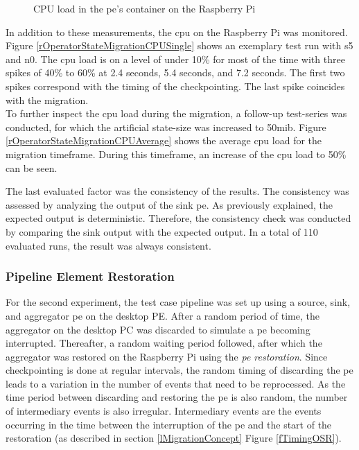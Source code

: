 \begin{figure}[!ht]
    \centering
    \caption{CPU load in the \gls{pe}'s container on the Raspberry Pi}%
    \label{rOperatorStateMigrationCPU}%
\end{figure}


In addition to these measurements, the \gls{cpu} on the Raspberry Pi was monitored. Figure \ref{rOperatorStateMigrationCPUSingle} shows an exemplary test run with s5 and n0. The \gls{cpu} load is on a level of under 10\% for most of the time with three spikes of 40\% to 60\% at 2.4 seconds, 5.4 seconds, and 7.2 seconds. The first two spikes correspond with the timing of the checkpointing. The last spike coincides with the migration.\\
To further inspect the \gls{cpu} load during the migration, a follow-up test-series was conducted, for which the artificial state-size was increased to 50\gls{mib}. Figure \ref{rOperatorStateMigrationCPUAverage} shows the average \gls{cpu} load for the migration timeframe. During this timeframe, an increase of the \gls{cpu} load to 50\% can be seen.\par

The last evaluated factor was the consistency of the results. The consistency was assessed by analyzing the output of the sink \gls{pe}. As previously explained, the expected output is deterministic. Therefore, the consistency check was conducted by comparing the sink output with the expected output. In a total of 110 evaluated runs, the result was always consistent. 

\subsubsection{Pipeline Element Restoration}
\label{lResultsOperatorStateRestoration}
For the second experiment, the test case pipeline was set up using a source, sink, and aggregator \gls{pe} on the desktop PE. After a random period of time, the aggregator on the desktop PC was discarded to simulate a \gls{pe} becoming interrupted. Thereafter, a random waiting period followed, after which the aggregator was restored on the Raspberry Pi using the \textit{\acrshort{pe} restoration}. Since checkpointing is done at regular intervals, the random timing of discarding the \gls{pe} leads to a variation in the number of events that need to be reprocessed. As the time period between discarding and restoring the \gls{pe} is also random, the number of intermediary events is also irregular. Intermediary events are the events occurring in the time between the interruption of the \gls{pe} and the start of the restoration (as described in section \ref{lMigrationConcept} Figure \ref{fTimingOSR}).\par

